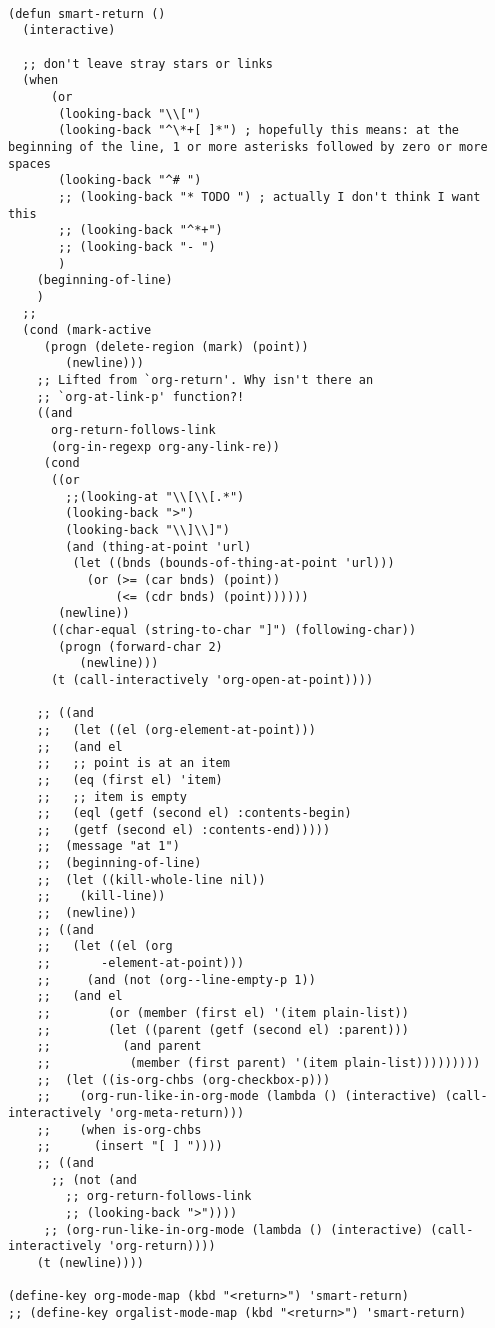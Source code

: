 \documentclass[11pt]{article}
\begin{document}
\label{sec:orgd99e251}
\begin{verbatim}

(defun smart-return ()
  (interactive)

  ;; don't leave stray stars or links
  (when
      (or
       (looking-back "\\[")
       (looking-back "^\*+[ ]*") ; hopefully this means: at the beginning of the line, 1 or more asterisks followed by zero or more spaces
       (looking-back "^# ")
       ;; (looking-back "* TODO ") ; actually I don't think I want this
       ;; (looking-back "^*+")
       ;; (looking-back "- ")
       )
    (beginning-of-line)
    )
  ;;
  (cond (mark-active
	 (progn (delete-region (mark) (point))
		(newline)))
	;; Lifted from `org-return'. Why isn't there an
	;; `org-at-link-p' function?!
	((and 
	  org-return-follows-link
	  (org-in-regexp org-any-link-re))
	 (cond
	  ((or
	    ;;(looking-at "\\[\\[.*")
	    (looking-back ">")
	    (looking-back "\\]\\]")
	    (and (thing-at-point 'url)
		 (let ((bnds (bounds-of-thing-at-point 'url)))
		   (or (>= (car bnds) (point))
		       (<= (cdr bnds) (point))))))
	   (newline))
	  ((char-equal (string-to-char "]") (following-char))
	   (progn (forward-char 2)
		  (newline)))
	  (t (call-interactively 'org-open-at-point))))

	;; ((and 
	;;   (let ((el (org-element-at-point)))
	;;   (and el
	;;   ;; point is at an item
	;;   (eq (first el) 'item)
	;;   ;; item is empty
	;;   (eql (getf (second el) :contents-begin)
	;;   (getf (second el) :contents-end)))))
	;;  (message "at 1")
	;;  (beginning-of-line)
	;;  (let ((kill-whole-line nil))
	;;    (kill-line))
	;;  (newline))
	;; ((and 
	;;   (let ((el (org
	;; 	     -element-at-point)))
	;;     (and (not (org--line-empty-p 1))
	;; 	 (and el
	;; 	      (or (member (first el) '(item plain-list))
	;; 		  (let ((parent (getf (second el) :parent)))
	;; 		    (and parent
	;; 			 (member (first parent) '(item plain-list)))))))))
	;;  (let ((is-org-chbs (org-checkbox-p)))
	;;    (org-run-like-in-org-mode (lambda () (interactive) (call-interactively 'org-meta-return)))
	;;    (when is-org-chbs
	;;      (insert "[ ] "))))
	;; ((and
	  ;; (not (and
		;; org-return-follows-link
		;; (looking-back ">"))))
	 ;; (org-run-like-in-org-mode (lambda () (interactive) (call-interactively 'org-return))))
	(t (newline))))

(define-key org-mode-map (kbd "<return>") 'smart-return)
;; (define-key orgalist-mode-map (kbd "<return>") 'smart-return)
\end{verbatim}
\end{document}
